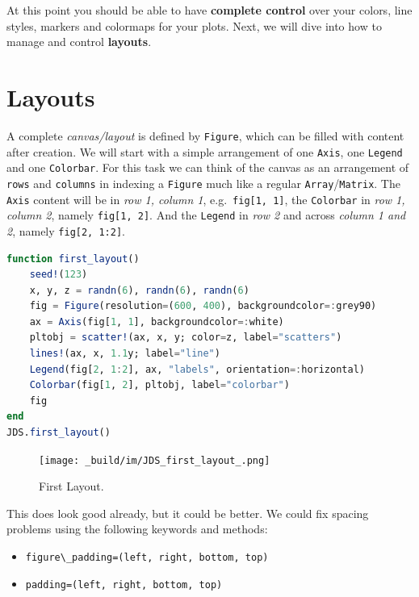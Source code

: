 \documentclass[
  notoc %
]{tufte-book}
\providecommand{\tightlist}{%
  \setlength{\itemsep}{0pt}\setlength{\parskip}{0pt}
}
\newcommand{\passthrough}[1]{#1}
\begin{document}
At this point you should be able to have \textbf{complete control} over
your colors, line styles, markers and colormaps for your plots. Next, we
will dive into how to manage and control \textbf{layouts}.

\hypertarget{sec:makie_layouts}{%
\section{Layouts}\label{sec:makie_layouts}}

A complete \emph{canvas/layout} is defined by
\passthrough{\lstinline!Figure!}, which can be filled with content after
creation. We will start with a simple arrangement of one
\passthrough{\lstinline!Axis!}, one \passthrough{\lstinline!Legend!} and
one \passthrough{\lstinline!Colorbar!}. For this task we can think of
the canvas as an arrangement of \passthrough{\lstinline!rows!} and
\passthrough{\lstinline!columns!} in indexing a
\passthrough{\lstinline!Figure!} much like a regular
\passthrough{\lstinline!Array!}/\passthrough{\lstinline!Matrix!}. The
\passthrough{\lstinline!Axis!} content will be in \emph{row 1, column
1}, e.g.~\passthrough{\lstinline!fig[1, 1]!}, the
\passthrough{\lstinline!Colorbar!} in \emph{row 1, column 2}, namely
\passthrough{\lstinline!fig[1, 2]!}. And the
\passthrough{\lstinline!Legend!} in \emph{row 2} and across \emph{column
1 and 2}, namely \passthrough{\lstinline!fig[2, 1:2]!}.

\begin{lstlisting}[language=Julia]
function first_layout()
    seed!(123)
    x, y, z = randn(6), randn(6), randn(6)
    fig = Figure(resolution=(600, 400), backgroundcolor=:grey90)
    ax = Axis(fig[1, 1], backgroundcolor=:white)
    pltobj = scatter!(ax, x, y; color=z, label="scatters")
    lines!(ax, x, 1.1y; label="line")
    Legend(fig[2, 1:2], ax, "labels", orientation=:horizontal)
    Colorbar(fig[1, 2], pltobj, label="colorbar")
    fig
end
JDS.first_layout()
\end{lstlisting}

\begin{figure}
\hypertarget{fig:first_layout}{%
\centering
\texttt{[image: \_build/im/JDS\_first\_layout\_.png]}
\caption{First Layout.}\label{fig:first_layout}
}
\end{figure}

This does look good already, but it could be better. We could fix
spacing problems using the following keywords and methods:

\begin{itemize}
\tightlist
\item
  \passthrough{\lstinline!figure\_padding=(left, right, bottom, top)!}
\item
  \passthrough{\lstinline!padding=(left, right, bottom, top)!}
\end{itemize}
\end{document}
